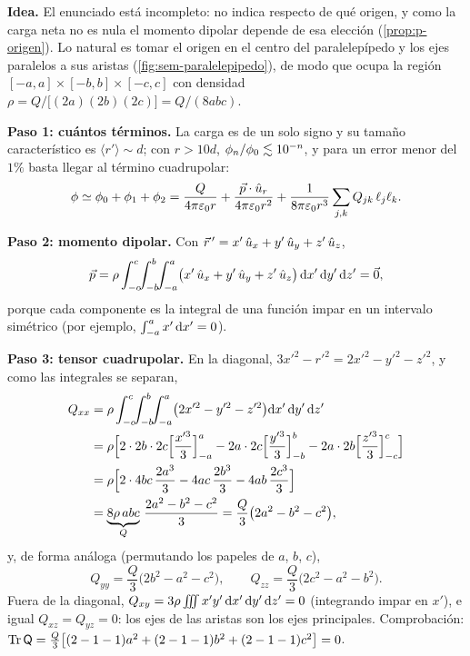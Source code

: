 \begin{resolucion}
\textbf{Idea.} El enunciado está incompleto: no indica respecto de qué origen, y como la carga neta no es nula el momento dipolar depende de esa elección
(\cref{prop:p-origen}). Lo natural es tomar el origen en el centro del paralelepípedo y los ejes paralelos a sus aristas (\cref{fig:sem-paralelepipedo}), de modo que ocupa la región
$[-a,a]\times[-b,b]\times[-c,c]$ con densidad $\rho=Q/\bigl[(2a)(2b)(2c)\bigr]=Q/(8abc)$.

\textbf{Paso 1: cuántos términos.} La carga es de un solo signo y su tamaño característico es $\langle r'\rangle\sim d$; con $r>10d$, $\phi_{n}/\phi_{0}\lesssim10^{-n}$, y para un
error menor del $1\%$ basta llegar al término cuadrupolar:
\[
  \phi\simeq\phi_{0}+\phi_{1}+\phi_{2}=\frac{Q}{4\pi\varepsilon_{0} r}+\frac{\vec{p}\cdot\hat{u}_{r}}{4\pi\varepsilon_{0} r^{2}}+\frac{1}{8\pi\varepsilon_{0} r^{3}}\sum_{j,k}Q_{jk}\,\ell_{j}\ell_{k}.
\]

\textbf{Paso 2: momento dipolar.} Con $\vec{r}\,'=x'\,\hat{u}_{x}+y'\,\hat{u}_{y}+z'\,\hat{u}_{z}$,
\[
  \vec{p}=\rho\int_{-c}^{c}\!\!\int_{-b}^{b}\!\!\int_{-a}^{a}\bigl(x'\,\hat{u}_{x}+y'\,\hat{u}_{y}+z'\,\hat{u}_{z}\bigr)\,\mathrm{d} x'\,\mathrm{d} y'\,\mathrm{d} z'=\vec{0},
\]
porque cada componente es la integral de una función impar en un intervalo simétrico (por ejemplo, $\int_{-a}^{a}x'\,\mathrm{d} x'=0$).

\textbf{Paso 3: tensor cuadrupolar.} En la diagonal, $3x'^{2}-r'^{2}=2x'^{2}-y'^{2}-z'^{2}$, y como las integrales se separan,
\begin{align*}
  Q_{xx}&=\rho\int_{-c}^{c}\!\!\int_{-b}^{b}\!\!\int_{-a}^{a}\bigl(2x'^{2}-y'^{2}-z'^{2}\bigr)\mathrm{d} x'\,\mathrm{d} y'\,\mathrm{d} z'\\
         &=\rho\Bigl[2\cdot2b\cdot2c\Bigl[\frac{x'^{3}}{3}\Bigr]_{-a}^{a}-2a\cdot2c\Bigl[\frac{y'^{3}}{3}\Bigr]_{-b}^{b}-2a\cdot2b\Bigl[\frac{z'^{3}}{3}\Bigr]_{-c}^{c}\Bigr]\\
        &=\rho\Bigl[2\cdot4bc\,\frac{2a^{3}}{3}-4ac\,\frac{2b^{3}}{3}-4ab\,\frac{2c^{3}}{3}\Bigr]\\
        &=\underbrace{8\rho\,abc}_{Q}\,\frac{2a^{2}-b^{2}-c^{2}}{3}=\frac{Q}{3}\bigl(2a^{2}-b^{2}-c^{2}\bigr),
\end{align*}
y, de forma análoga (permutando los papeles de $a$, $b$, $c$),
\[
  Q_{yy}=\frac{Q}{3}\bigl(2b^{2}-a^{2}-c^{2}\bigr),\qquad Q_{zz}=\frac{Q}{3}\bigl(2c^{2}-a^{2}-b^{2}\bigr).
\]
Fuera de la diagonal, $Q_{xy}=3\rho\iiint x'y'\,\mathrm{d} x'\,\mathrm{d} y'\,\mathrm{d} z'=0$ (integrando impar en $x'$), e igual $Q_{xz}=Q_{yz}=0$: los ejes de las aristas son los ejes principales.
Comprobación: $\operatorname{Tr}\mathsf{Q}=\frac{Q}{3}\bigl[(2-1-1)a^{2}+(2-1-1)b^{2}+(2-1-1)c^{2}\bigr]=0$.


\end{resolucion}
